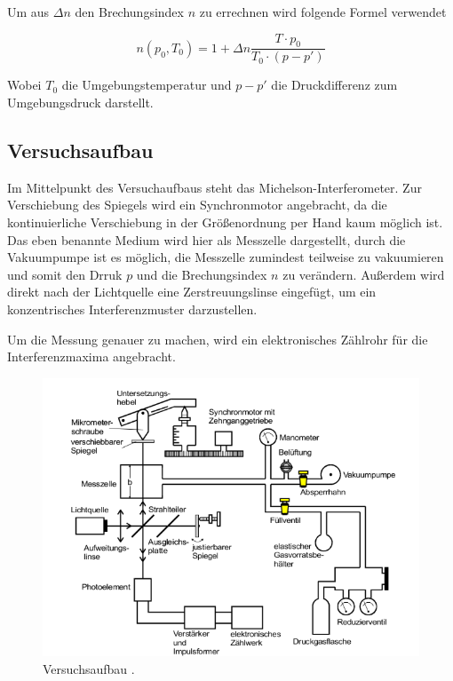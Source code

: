 Um aus $\Delta n $ den Brechungsindex $n$ zu errechnen wird folgende Formel verwendet

\begin{equation}
  n(p_0,T_0) = 1 + \Delta n \frac{T \cdot p_0}{T_0 \cdot (p - p')}
\end{equation}

Wobei $T_0$ die Umgebungstemperatur und $p - p'$ die Druckdifferenz zum Umgebungsdruck darstellt.

\subsection{Versuchsaufbau}

Im Mittelpunkt des Versuchaufbaus steht das Michelson-Interferometer. Zur Verschiebung des Spiegels wird ein Synchronmotor angebracht, da die kontinuierliche Verschiebung in der Größenordnung
per Hand kaum möglich ist. Das eben benannte Medium wird hier als Messzelle dargestellt, durch die Vakuumpumpe ist es möglich, die Messzelle zumindest teilweise zu vakuumieren und
somit den Drruk $p$ und die Brechungsindex $n$ zu verändern. Außerdem wird direkt nach der Lichtquelle eine Zerstreuungslinse eingefügt, um ein konzentrisches Interferenzmuster darzustellen.

Um die Messung genauer zu machen, wird ein elektronisches Zählrohr für die Interferenzmaxima angebracht.
\begin{figure}
  \centering
  \includegraphics[scale = 0.5]{V401-Bild3.png}
  \caption{Versuchsaufbau \cite{Q1}.}
  \label{Abb:3}
\end{figure}

